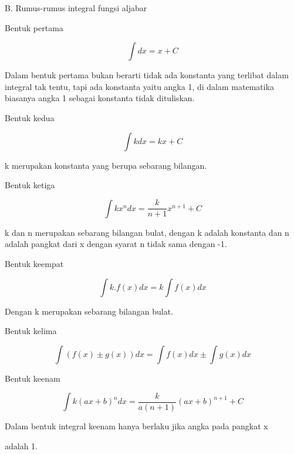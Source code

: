 \documentclass[a4paper,10pt]{article}
\begin{document}
\begin{eulernotebook}
\begin{eulercomment}
\end{eulercomment}
\begin{eulerttcomment}
    B. Rumus-rumus integral fungsi aljabar
\end{eulerttcomment}
\begin{eulercomment}
Bentuk pertama\\
\end{eulercomment}
\begin{eulerformula}
\[
\int dx = x + C
\]
\end{eulerformula}
\begin{eulercomment}
Dalam bentuk pertama bukan berarti tidak ada konstanta yang terlibat
dalam integral tak tentu, tapi ada konstanta yaitu angka 1, di dalam
matematika biasanya angka 1 sebagai konstanta tidak dituliskan.

Bentuk kedua\\
\end{eulercomment}
\begin{eulerformula}
\[
\int k dx = kx + C
\]
\end{eulerformula}
\begin{eulercomment}
k merupakan konstanta yang berupa sebarang bilangan.

Bentuk ketiga\\
\end{eulercomment}
\begin{eulerformula}
\[
\int kx^n dx = \frac {k}{n+1} x^{n+1} + C
\]
\end{eulerformula}
\begin{eulercomment}
k dan n merupakan sebarang bilangan bulat, dengan k adalah konstanta
dan n adalah pangkat dari x dengan syarat n tidak sama dengan -1.

Bentuk keempat\\
\end{eulercomment}
\begin{eulerformula}
\[
\int k.f(x) dx = k \int f(x) dx
\]
\end{eulerformula}
\begin{eulerttcomment}
 Dengan k merupakan sebarang bilangan bulat.
\end{eulerttcomment}
\begin{eulercomment}
Bentuk kelima\\
\end{eulercomment}
\begin{eulerformula}
\[
\int (f(x)\pm g(x)) dx = \int f(x) dx \pm \int g(x) dx
\]
\end{eulerformula}
\begin{eulercomment}
Bentuk keenam\\
\end{eulercomment}
\begin{eulerformula}
\[
\int k(ax+b)^n dx = \frac {k}{a(n+1)} (ax+b)^{n+1} + C
\]
\end{eulerformula}
\begin{eulerttcomment}
 Dalam bentuk integral keenam hanya berlaku jika angka pada pangkat x
\end{eulerttcomment}
\begin{eulercomment}
adalah 1.



\end{eulercomment}
\end{eulernotebook}
\end{document}
